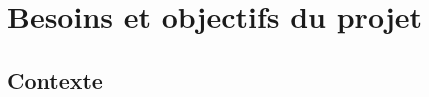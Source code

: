 \documentclass[11pt]{article}
\begin{document}


\section{Besoins et objectifs du projet}
\subsection{Contexte}
\end{document}
